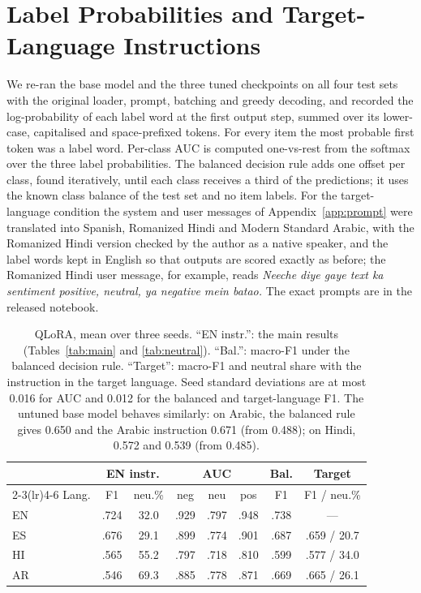 \documentclass[11pt]{article}
\begin{document}
\section{Label Probabilities and Target-Language Instructions}
\label{app:c1c2}

We re-ran the base model and the three tuned checkpoints on all four test sets with
the original loader, prompt, batching and greedy decoding, and recorded the
log-probability of each label word at the first output step, summed over its
lower-case, capitalised and space-prefixed tokens. For every item the most probable
first token was a label word.
Per-class AUC is computed one-vs-rest from the softmax over the three label
probabilities. The balanced decision rule adds one offset per class, found
iteratively, until each class receives a third of the predictions; it uses the
known class balance of the test set and no item labels. For the target-language
condition the system and user messages of Appendix~\ref{app:prompt} were translated
into Spanish, Romanized Hindi and Modern Standard Arabic, with the Romanized Hindi
version checked by the author as a native speaker, and the label words kept in English so that outputs are scored
exactly as before; the Romanized Hindi user message, for example, reads
\textit{Neeche diye gaye text ka sentiment positive, neutral, ya negative mein
batao.} The exact prompts are in the released notebook.

\begin{table}[H]
\centering\small
\setlength{\tabcolsep}{2.5pt}
\begin{tabular}{@{}lccccccc@{}}
\toprule
& \multicolumn{2}{c}{EN instr.} & \multicolumn{3}{c}{AUC} & Bal. & \multicolumn{1}{c}{Target} \\
\cmidrule(lr){2-3}\cmidrule(lr){4-6}
Lang. & F1 & neu.\% & neg & neu & pos & F1 & F1 / neu.\% \\
\midrule
EN & .724 & 32.0 & .929 & .797 & .948 & .738 & --- \\
ES & .676 & 29.1 & .899 & .774 & .901 & .687 & .659 / 20.7 \\
HI & .565 & 55.2 & .797 & .718 & .810 & .599 & .577 / 34.0 \\
AR & .546 & 69.3 & .885 & .778 & .871 & .669 & .665 / 26.1 \\
\bottomrule
\end{tabular}
\caption{QLoRA, mean over three seeds. ``EN instr.'': the main results
(Tables~\ref{tab:main} and \ref{tab:neutral}). ``Bal.'': macro-F1 under the
balanced decision rule. ``Target'': macro-F1 and neutral share with the instruction
in the target language. Seed standard deviations are at most 0.016 for AUC and
0.012 for the balanced and target-language F1. The untuned base model behaves similarly: on Arabic,
the balanced rule gives 0.650 and the Arabic instruction 0.671 (from 0.488); on
Hindi, 0.572 and 0.539 (from 0.485).}
\label{tab:c1c2}
\end{table}
\end{document}
